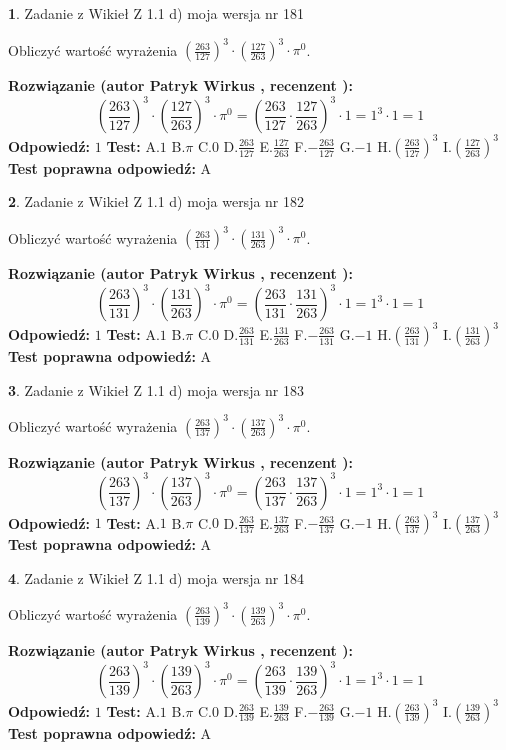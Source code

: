 \documentclass[12pt, a4paper]{article}
\theoremstyle{definition} %
\newtheorem{zad}{}
\newcommand{\zadStart}[1]{\begin{zad}#1\newline}
\newcommand{\zadStop}{\end{zad}}
\newcommand{\rozwStart}[2]{\noindent \textbf{Rozwiązanie (autor #1 , recenzent #2): }\newline}
\newcommand{\rozwStop}{\newline}
\newcommand{\odpStart}{\noindent \textbf{Odpowiedź:}\newline}
\newcommand{\odpStop}{\newline}
\newcommand{\testStart}{\noindent \textbf{Test:}\newline}
\newcommand{\testStop}{\newline}
\newcommand{\kluczStart}{\noindent \textbf{Test poprawna odpowiedź:}\newline}
\newcommand{\kluczStop}{\newline}
\begin{document}
\zadStart{Zadanie z Wikieł Z 1.1 d) moja wersja nr 181}

Obliczyć wartość wyrażenia $(\frac{263}{127})^{3} \cdot (\frac{127}{263})^{3} \cdot \pi^{0}$.
\zadStop
\rozwStart{Patryk Wirkus}{}
$$(\frac{263}{127})^{3} \cdot (\frac{127}{263})^{3} \cdot \pi^{0} = (\frac{263}{127} \cdot \frac{127}{263})^{3} \cdot 1 = 1^{3} \cdot 1 = 1$$
\rozwStop
\odpStart
$1$
\odpStop
\testStart
A.$1$ B.$\pi$ C.$0$ D.$\frac{263}{127}$ E.$\frac{127}{263}$
F.$-\frac{263}{127}$ G.$-1$
H.$(\frac{263}{127})^{3}$
I.$(\frac{127}{263})^{3}$
\testStop
\kluczStart
A
\kluczStop



\zadStart{Zadanie z Wikieł Z 1.1 d) moja wersja nr 182}

Obliczyć wartość wyrażenia $(\frac{263}{131})^{3} \cdot (\frac{131}{263})^{3} \cdot \pi^{0}$.
\zadStop
\rozwStart{Patryk Wirkus}{}
$$(\frac{263}{131})^{3} \cdot (\frac{131}{263})^{3} \cdot \pi^{0} = (\frac{263}{131} \cdot \frac{131}{263})^{3} \cdot 1 = 1^{3} \cdot 1 = 1$$
\rozwStop
\odpStart
$1$
\odpStop
\testStart
A.$1$ B.$\pi$ C.$0$ D.$\frac{263}{131}$ E.$\frac{131}{263}$
F.$-\frac{263}{131}$ G.$-1$
H.$(\frac{263}{131})^{3}$
I.$(\frac{131}{263})^{3}$
\testStop
\kluczStart
A
\kluczStop



\zadStart{Zadanie z Wikieł Z 1.1 d) moja wersja nr 183}

Obliczyć wartość wyrażenia $(\frac{263}{137})^{3} \cdot (\frac{137}{263})^{3} \cdot \pi^{0}$.
\zadStop
\rozwStart{Patryk Wirkus}{}
$$(\frac{263}{137})^{3} \cdot (\frac{137}{263})^{3} \cdot \pi^{0} = (\frac{263}{137} \cdot \frac{137}{263})^{3} \cdot 1 = 1^{3} \cdot 1 = 1$$
\rozwStop
\odpStart
$1$
\odpStop
\testStart
A.$1$ B.$\pi$ C.$0$ D.$\frac{263}{137}$ E.$\frac{137}{263}$
F.$-\frac{263}{137}$ G.$-1$
H.$(\frac{263}{137})^{3}$
I.$(\frac{137}{263})^{3}$
\testStop
\kluczStart
A
\kluczStop



\zadStart{Zadanie z Wikieł Z 1.1 d) moja wersja nr 184}

Obliczyć wartość wyrażenia $(\frac{263}{139})^{3} \cdot (\frac{139}{263})^{3} \cdot \pi^{0}$.
\zadStop
\rozwStart{Patryk Wirkus}{}
$$(\frac{263}{139})^{3} \cdot (\frac{139}{263})^{3} \cdot \pi^{0} = (\frac{263}{139} \cdot \frac{139}{263})^{3} \cdot 1 = 1^{3} \cdot 1 = 1$$
\rozwStop
\odpStart
$1$
\odpStop
\testStart
A.$1$ B.$\pi$ C.$0$ D.$\frac{263}{139}$ E.$\frac{139}{263}$
F.$-\frac{263}{139}$ G.$-1$
H.$(\frac{263}{139})^{3}$
I.$(\frac{139}{263})^{3}$
\testStop
\kluczStart
A
\kluczStop
\end{document}
